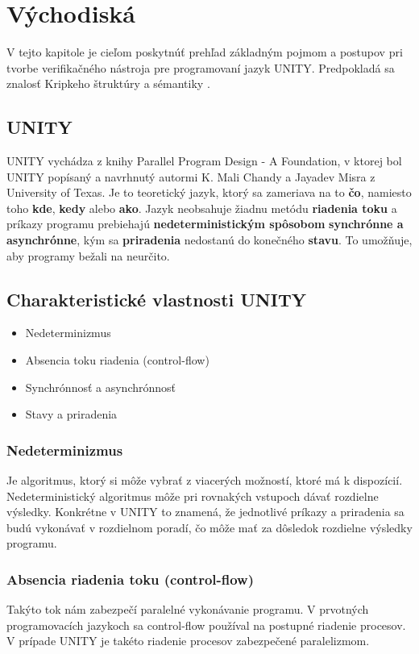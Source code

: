 \chapter{Východiská}\label{chap:vychodiska}
V tejto kapitole je cieľom poskytnúť prehľad základným pojmom a postupov pri tvorbe verifikačného 
nástroja pre programovaní jazyk UNITY. Predpokladá sa znalosť Kripkeho štruktúry a sémantiky \cite{br11}.

\section{UNITY}

UNITY vychádza z knihy Parallel Program Design - A Foundation, v ktorej bol UNITY popísaný a 
navrhnutý autormi K. Mali Chandy a Jayadev Misra z University of Texas. Je to teoretický jazyk, 
ktorý sa zameriava na to \textbf{čo}, namiesto toho \textbf{kde}, \textbf{kedy} alebo \textbf{ako}. 
Jazyk neobsahuje žiadnu metódu \textbf{riadenia toku} a príkazy programu prebiehajú 
\textbf{nedeterministickým spôsobom} \textbf{synchrónne a asynchrónne}, kým sa \textbf{priradenia} nedostanú do konečného \textbf{stavu}.
To umožňuje, aby programy bežali na neurčito. \cite{br1}

\section{Charakteristické vlastnosti UNITY}

\begin{itemize}
	\item Nedeterminizmus
	\item Absencia toku riadenia (control-flow)
	\item Synchrónnosť a asynchrónnosť
	\item Stavy a priradenia
\end{itemize}


\subsection{Nedeterminizmus}
Je algoritmus, ktorý si môže vybrať z viacerých možností, ktoré má k dispozícií. Nedeterministický algoritmus 
môže pri rovnakých vstupoch dávať rozdielne výsledky. Konkrétne v UNITY to znamená, že jednotlivé príkazy a priradenia 
sa budú vykonávať v rozdielnom poradí, čo môže mať za dôsledok rozdielne výsledky programu.

\subsection{Absencia riadenia toku (control-flow)}
Takýto tok nám zabezpečí paralelné vykonávanie programu. V prvotných programovacích jazykoch sa control-flow používal
na postupné riadenie procesov. V prípade UNITY je takéto riadenie procesov zabezpečené paralelizmom.

